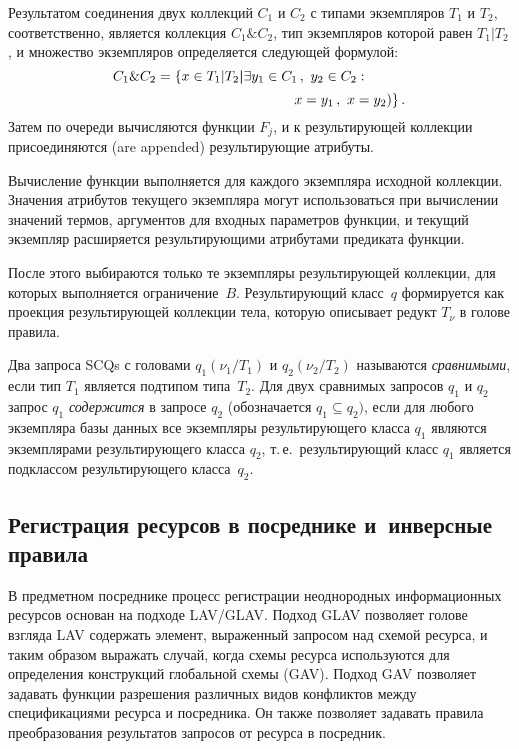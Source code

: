 \begin{multicols}{2}
     Результатом соединения двух коллекций $C_1$ и $C_2$ с типами экземпляров
$T_1$ и $T_2$, соответственно, является коллекция $C_1\&C_2$, тип экземпляров которой
равен $T_1\vert T_2$, и множество экземпляров определяется следующей формулой:
$$%
C_1 \& C_2 = \{ x\in T_1\vert T_2 \mbox{\boldmath$\vert$}  \exists y_1\in C_1\,,\
y_2\in C_2:\hspace*{30pt}
$$%
$$
\hspace*{130pt} x = y_1\,,\ x = y_2) \}\,.
$$%
     Затем по очереди вычисляются функции $F_j$, и к результирующей коллекции
присоединяются (are appended) результирующие атрибуты.

Вычисление функции
выполняется для каждого экземпляра исходной коллекции. Значения атрибутов текущего
экземпляра могут использоваться при вычислении значений термов, аргументов для
входных па\-ра\-мет\-ров функции, и текущий экземпляр расширяется результирующими
атрибутами предиката функции.

После этого выбираются только те экземпляры
результирующей коллекции, для которых выполняется ограничение~$B$.
Результирующий класс~$q$ формируется как проекция результирующей коллекции тела,
которую описывает редукт $T_\nu$  в голове пра\-вила.

     Два запроса SCQs с головами $q_1(\nu_1/T_1)$ и $q_2(\nu_2/T_2)$ называются
\textit{сравнимыми}, если тип $T_1$ является подтипом типа~$T_2$. Для двух сравнимых
запросов $q_1$ и $q_2$ запрос $q_1$ \textit{содержится} в запросе $q_2$ (обозначается
$q_1\subseteq  q_2)$, если для любого экземпляра базы данных все экземпляры
результирующего класса $q_1$ являются экземплярами результирующего класса $q_2$,
т.\,е.\ результирующий класс $q_1$ является подклассом результирующего класса~$q_2$.


\subsection{Регистрация ресурсов в посреднике и~инверсные правила}

     В предметном посреднике процесс регистрации неоднородных информационных
ресурсов
основан на подходе LAV/GLAV. Подход GLAV позволяет голове взгляда LAV
содержать элемент, выраженный запросом над схемой ресурса, и таким образом выражать
случай, когда схемы ресурса используются для определения конструкций глобальной
схемы (GAV). Подход GAV позволяет задавать функции разрешения различных видов
конфликтов между спецификациями ресурса и посредника. Он также позволяет
задавать правила преобразования результатов запросов от ресурса в посредник.


\end{multicols}
